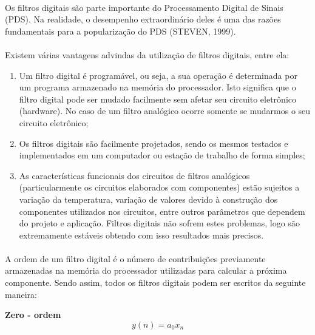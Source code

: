 \documentclass[12pt,fleqn]{article}
\begin{document}
\paragraph{} Os filtros digitais são parte importante do Processamento Digital de Sinais (PDS). Na realidade, o desempenho extraordinário deles é uma das razões fundamentais para a popularização do PDS (STEVEN, 1999).

\paragraph{} Existem várias vantagens advindas da utilização de filtros digitais, entre ela:

\begin{enumerate}
    \item Um filtro digital é programável, ou seja, a sua operação é determinada por um programa armazenado na memória do processador. Isto significa que o filtro digital pode ser mudado facilmente sem afetar seu circuito eletrônico (hardware). No caso de um filtro analógico ocorre somente se mudarmos o seu circuito eletrônico;
    
    \item Os filtros digitais são facilmente projetados, sendo os mesmos testados e implementados em um computador ou estação de trabalho de forma simples;
    
    \item  As características funcionais dos circuitos de filtros analógicos (particularmente os circuitos elaborados com componentes) estão sujeitos a variação da temperatura, variação de valores devido à construção dos componentes utilizados nos circuitos, entre outros parâmetros que dependem do projeto e aplicação. Filtros digitais não sofrem estes problemas, logo são extremamente estáveis obtendo com isso resultados mais precisos.
\end{enumerate}

\paragraph{} A ordem de um filtro digital é o número de contribuições previamente armazenadas na memória do processador utilizadas para calcular a próxima componente. Sendo assim, todos os filtros digitais podem ser escritos da seguinte maneira:

\textbf{Zero - ordem}
\begin{equation}
y(n) = a_0x_n
\end{equation}
\end{document}
